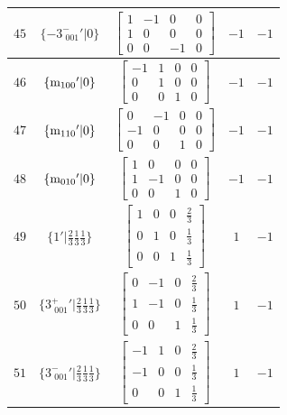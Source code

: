 \documentclass[fleqn,8pt]{jsarticle}
\begin{document}
\begin{longtable}{ccccc}
$ 45 $ & $ \{-3^{-}_{\,\,001}{}'|0\} $ & $ \begin{bmatrix} 1 & -1 & 0 & 0 \\ 1 & 0 & 0 & 0 \\ 0 & 0 & -1 & 0 \end{bmatrix} $ & $ -1 $ & $ -1 $ \\ \hline
$ 46 $ & $ \{{\rm m}_{100}{}'|0\} $ & $ \begin{bmatrix} -1 & 1 & 0 & 0 \\ 0 & 1 & 0 & 0 \\ 0 & 0 & 1 & 0 \end{bmatrix} $ & $ -1 $ & $ -1 $ \\ \hline
$ 47 $ & $ \{{\rm m}_{110}{}'|0\} $ & $ \begin{bmatrix} 0 & -1 & 0 & 0 \\ -1 & 0 & 0 & 0 \\ 0 & 0 & 1 & 0 \end{bmatrix} $ & $ -1 $ & $ -1 $ \\ \hline
$ 48 $ & $ \{{\rm m}_{010}{}'|0\} $ & $ \begin{bmatrix} 1 & 0 & 0 & 0 \\ 1 & -1 & 0 & 0 \\ 0 & 0 & 1 & 0 \end{bmatrix} $ & $ -1 $ & $ -1 $ \\ \hline
$ 49 $ & $ \{1{}'|\frac{2}{3} \frac{1}{3} \frac{1}{3}\} $ & $ \begin{bmatrix} 1 & 0 & 0 & \frac{2}{3} \\ 0 & 1 & 0 & \frac{1}{3} \\ 0 & 0 & 1 & \frac{1}{3} \end{bmatrix} $ & $ 1 $ & $ -1 $ \\ \hline
$ 50 $ & $ \{3^{+}_{\,\,001}{}'|\frac{2}{3} \frac{1}{3} \frac{1}{3}\} $ & $ \begin{bmatrix} 0 & -1 & 0 & \frac{2}{3} \\ 1 & -1 & 0 & \frac{1}{3} \\ 0 & 0 & 1 & \frac{1}{3} \end{bmatrix} $ & $ 1 $ & $ -1 $ \\ \hline
$ 51 $ & $ \{3^{-}_{\,\,001}{}'|\frac{2}{3} \frac{1}{3} \frac{1}{3}\} $ & $ \begin{bmatrix} -1 & 1 & 0 & \frac{2}{3} \\ -1 & 0 & 0 & \frac{1}{3} \\ 0 & 0 & 1 & \frac{1}{3} \end{bmatrix} $ & $ 1 $ & $ -1 $ \\ \hline

\end{longtable}
\end{document}
